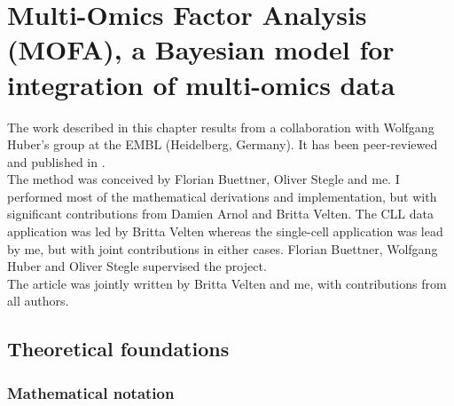 \graphicspath{{Chapter2/Figs/}}

\chapter{Multi-Omics Factor Analysis (MOFA), a Bayesian model for integration of multi-omics data}

The work described in this chapter results from a collaboration with Wolfgang Huber's group at the EMBL (Heidelberg, Germany). It has been peer-reviewed and published in \cite{Argelaguet2018}.\\
The method was conceived by Florian Buettner, Oliver Stegle and me. I performed most of the mathematical derivations and implementation, but with significant contributions from Damien Arnol and Britta Velten. The CLL data application was led by Britta Velten whereas the single-cell application was lead by me, but with joint contributions in either cases. Florian Buettner, Wolfgang Huber and Oliver Stegle supervised the project.\\
The article was jointly written by Britta Velten and me, with contributions from all authors.

\section{Theoretical foundations}

\subsection{Mathematical notation} \label{section:mathematical_notation}

